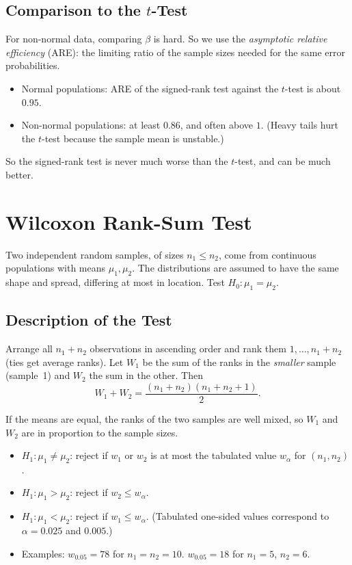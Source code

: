 \subsection{Comparison to the $t$-Test}

For non-normal data, comparing $\beta$ is hard. So we use the \emph{asymptotic relative efficiency} (ARE): the limiting ratio of the sample sizes needed for the same error probabilities.
\begin{itemize}
  \item Normal populations: ARE of the signed-rank test against the $t$-test is about $0.95$.
  \item Non-normal populations: at least $0.86$, and often above $1$. (Heavy tails hurt the $t$-test because the sample mean is unstable.)
\end{itemize}
So the signed-rank test is never much worse than the $t$-test, and can be much better.

\section{Wilcoxon Rank-Sum Test}

Two independent random samples, of sizes $n_1\le n_2$, come from continuous populations with means $\mu_1,\mu_2$. The distributions are assumed to have the same shape and spread, differing at most in location. Test $H_0:\mu_1=\mu_2$.

\subsection{Description of the Test}

\begin{definition}
Arrange all $n_1+n_2$ observations in ascending order and rank them $1,\dots,n_1+n_2$ (ties get average ranks). Let $W_1$ be the sum of the ranks in the \emph{smaller} sample (sample~1) and $W_2$ the sum in the other. Then
\[ W_1+W_2=\frac{(n_1+n_2)(n_1+n_2+1)}2. \]
\end{definition}

If the means are equal, the ranks of the two samples are well mixed, so $W_1$ and $W_2$ are in proportion to the sample sizes.
\begin{itemize}
  \item $H_1:\mu_1\ne\mu_2$: reject if $w_1$ or $w_2$ is at most the tabulated value $w_\alpha$ for $(n_1,n_2)$.
  \item $H_1:\mu_1>\mu_2$: reject if $w_2\le w_\alpha$.
  \item $H_1:\mu_1<\mu_2$: reject if $w_1\le w_\alpha$. (Tabulated one-sided values correspond to $\alpha=0.025$ and $0.005$.)
  \item Examples: $w_{0.05}=78$ for $n_1=n_2=10$. $w_{0.05}=18$ for $n_1=5$, $n_2=6$.
\end{itemize}

